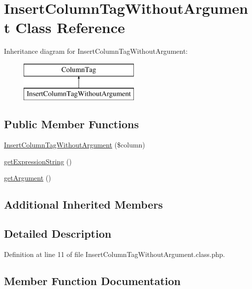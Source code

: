 \hypertarget{classInsertColumnTagWithoutArgument}{}\section{Insert\+Column\+Tag\+Without\+Argument Class Reference}
\label{classInsertColumnTagWithoutArgument}
Inheritance diagram for Insert\+Column\+Tag\+Without\+Argument\+:\begin{figure}[H]
\begin{center}
\leavevmode
\includegraphics[height=2.000000cm]{classInsertColumnTagWithoutArgument}
\end{center}
\end{figure}
\subsection*{Public Member Functions}
\begin{DoxyCompactItemize}
\item 
\hyperlink{classInsertColumnTagWithoutArgument_ae1e10363dd8d24dff6cd05ca7711e455}{Insert\+Column\+Tag\+Without\+Argument} (\$column)
\item 
\hyperlink{classInsertColumnTagWithoutArgument_a0ea3febe1aed5e5f0fd8ac97fb0a8ac6}{get\+Expression\+String} ()
\item 
\hyperlink{classInsertColumnTagWithoutArgument_a728f587b2a45ff2b56c1f883197a3c4c}{get\+Argument} ()
\end{DoxyCompactItemize}
\subsection*{Additional Inherited Members}


\subsection{Detailed Description}


Definition at line 11 of file Insert\+Column\+Tag\+Without\+Argument.\+class.\+php.



\subsection{Member Function Documentation}
\hypertarget{classInsertColumnTagWithoutArgument_a728f587b2a45ff2b56c1f883197a3c4c}{}\label{classInsertColumnTagWithoutArgument_a728f587b2a45ff2b56c1f883197a3c4c} 
